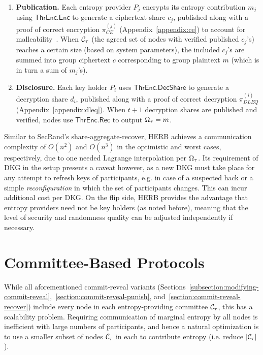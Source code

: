 \begin{enumerate}
    \item \textbf{Publication.} Each entropy provider $P_j$ encrypts its entropy contribution $m_j$ using $\mathsf{ThrEnc.Enc}$ to generate a ciphertext share $c_j$, published along with a proof of correct encryption $\pi_{CE}^{(j)}$ (Appendix~\ref{appendix:ce}) to account for malleability~\cite{dolev2003nonmalleable}. When $\mathcal{C}_\tau$ (the agreed set of nodes with verified published $c_j$'s) reaches a certain size (based on system parameters), the included $c_j$'s are summed into group ciphertext $c$ corresponding to group plaintext $m$ (which is in turn a sum of $m_j$'s).
    \item \textbf{Disclosure.} Each key holder $P_i$ uses $\mathsf{ThrEnc.DecShare}$ to generate a decryption share $d_i$, published along with a proof of correct decryption $\pi_{DLEQ}^{(i)}$ (Appendix~\ref{appendix:dleq}). When $t + 1$ decryption shares are published and verified, nodes use $\mathsf{ThrEnc.Rec}$ to output $\Omega_\tau = m$.
\end{enumerate}

Similar to SecRand's share-aggregate-recover, HERB achieves a communication complexity of $O(n^2)$ and $O(n^3)$ in the optimistic and worst cases, respectively, due to one needed Lagrange interpolation per $\Omega_\tau$. Its requirement of DKG in the setup presents a caveat however, as a new DKG must take place for any attempt to refresh keys of participants, e.g. in case of a suspected hack or a simple \textit{reconfiguration} in which the set of participants changes. This can incur additional cost per DKG. On the flip side, HERB provides the advantage that entropy providers need not be key holders (as noted before), meaning that the level of security and randomness quality can be adjusted independently if necessary.

\section{Committee-Based Protocols}
\label{section:committee-based}
While all aforementioned commit-reveal variants (Sections~\ref{subsection:modifying-commit-reveal},~\ref{section:commit-reveal-punish}, and~\ref{section:commit-reveal-recover}) include every node in each entropy-providing committee $\mathcal{C}_\tau$, this has a scalability problem.
Requiring communication of marginal entropy by all nodes is inefficient with large numbers of participants, and hence a natural optimization is to use a smaller subset of nodes $\mathcal{C}_\tau$ in each \epoch to contribute entropy (i.e. reduce $|\mathcal{C}_\tau|$).

